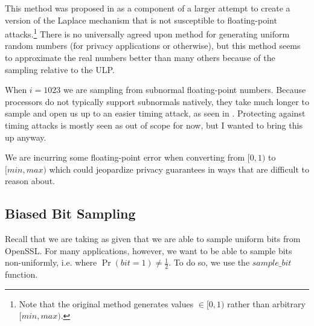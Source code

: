 \documentclass[11pt]{scrartcl} %
\begin{document}
This method was proposed in \cite{Mir12} as a component of a larger attempt to create
a version of the Laplace mechanism that is not susceptible to floating-point attacks.\footnote{Note that the
original method generates values $\in [0,1)$ rather than arbitrary $[min, max)$.}
There is no universally agreed upon method for generating uniform random numbers (for privacy
applications or otherwise), but this method seems to approximate the real numbers better than many
others because of the sampling relative to the ULP. \newline

\begin{tcolorbox}[colback = {green}, title = {Known Privacy Issues}, colbacktitle = black]
	When $i=1023$ we are sampling from subnormal floating-point numbers. Because processors do not typically support
	subnormals natively, they take much longer to sample and open us up to an easier timing attack, as
	seen in \cite{AKM+15}.
	Protecting against timing attacks is mostly seen as out of scope for now, but I wanted
	to bring this up anyway. \newline

	We are incurring some floating-point error when converting from $[0,1)$ to $[min, max)$ which
	could jeopardize privacy guarantees in ways that are difficult to reason about.\cite{Mir12} \cite{Ilv19}
\end{tcolorbox}

\subsection{Biased Bit Sampling}
Recall that we are taking as given that we are able to sample uniform bits from OpenSSL.
For many applications, however, we want to be able to sample bits non-uniformly,
i.e. where $\Pr(bit = 1) \neq \frac{1}{2}$. To do so, we use the $sample\_bit$ function.
\end{document}

